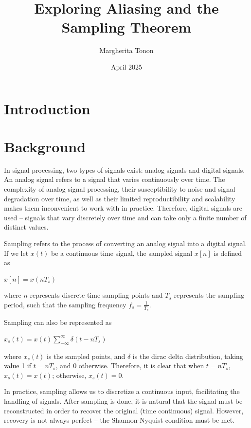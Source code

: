 \documentclass{article}
\title{Exploring Aliasing and the Sampling Theorem} %
\author{Margherita Tonon}
\date{April 2025}
\begin{document}
\maketitle

\section{Introduction}

\section{Background}
In signal processing, two types of signals exist: analog signals and digital signals. %
An analog signal refers to a signal that varies continuously over time. 
The complexity of analog signal processing, their susceptibility to noise and signal degradation over time, as well as their limited reproductibility and scalability makes them inconvenient to work with in practice. 
Therefore, digital signals are used -- signals that vary discretely over time and can take only a finite number of distinct values.

Sampling refers to the process of converting an analog signal into a digital signal. If we let $x(t)$ be a continuous time signal, the sampled signal $x[n]$ is defined as
\begin{center}
    \begin{math}
        x[n] = x(nT_s)
    \end{math}  
\end{center}
where $n$ represents discrete time sampling points and $T_s$ represents the sampling period, such that the sampling frequency $f_s = \frac{1}{T_s}$.

Sampling can also be represented as 
\begin{center}
    \begin{math}
        x_s(t) = x(t) \sum_{-\infty}^{\infty} \delta (t-nT_s)
    \end{math}  
\end{center}
where $x_s(t)$ is the sampled points, and $\delta$ is the dirac delta distribution, taking value 1 if $t=nT_s$, and 0 otherwise.
Therefore, it is clear that when $t=nT_s$, $x_s(t) = x(t)$; otherwise, $x_s(t) = 0$. 

In practice, sampling allows us to discretize a continuous input, facilitating the handling of signals. After sampling is done, it is natural that the signal must be reconstructed in order to recover the original (time continuous) signal.
However, recovery is not always perfect -- the Shannon-Nyquist condition must be met.
\end{document}

